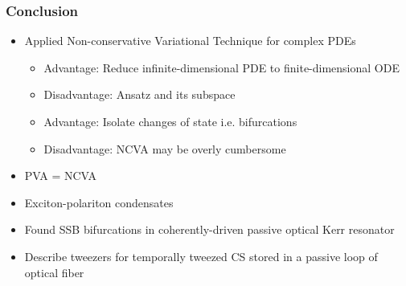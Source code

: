 \begin{frame}
\frametitle{Conclusion}
\begin{block}{}
\begin{itemize}
\item Applied Non-conservative Variational Technique for complex PDEs
\begin{itemize}
\item  \textcolor{paleblue}{Advantage}:  Reduce infinite-dimensional PDE to finite-dimensional ODE 
\item  \textcolor{regal}{Disadvantage}:  Ansatz and its subspace
\item  \textcolor{paleblue}{Advantage}:  Isolate changes of state i.e. bifurcations
\item  \textcolor{regal}{Disadvantage}:  NCVA may be overly cumbersome
\end{itemize}
\item PVA = NCVA 
\item Exciton-polariton condensates 
\item Found SSB bifurcations in coherently-driven passive optical Kerr resonator
\item Describe tweezers for temporally tweezed CS stored in a passive loop of optical fiber

\end{itemize}
\end{block}
\end{frame}


